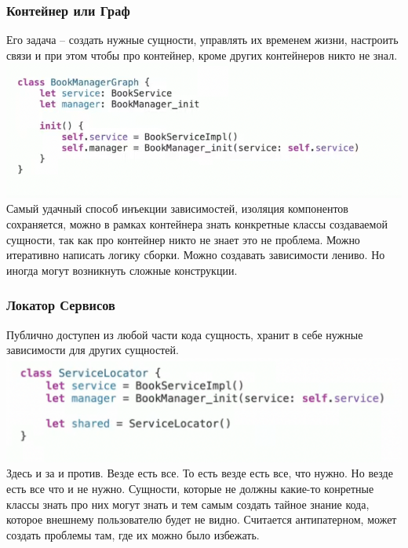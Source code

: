 \documentclass{article}
\begin{document}
    \subsubsection{Контейнер или Граф}
    Его задача -- создать нужные сущности, управлять их временем жизни, настроить связи и при этом чтобы про контейнер, кроме других контейнеров никто не знал. 
    \newline
    \includegraphics[scale = 0.5]{pic/Снимок экрана 2023-07-31 в 01.30.14.png}
    \newline
    Самый удачный способ инъекции зависимостей, изоляция компонентов сохраняется, можно в рамках контейнера знать конкретные классы создаваемой сущности, так как про контейнер никто не знает это не проблема. Можно итеративно написать логику сборки. Можно создавать зависимости лениво. 
    \newline
    Но иногда могут возникнуть сложные конструкции. 
    \subsubsection{Локатор Сервисов}
    Публично доступен из любой части кода сущность, хранит в себе нужные зависимости для других сущностей. 
    \newline
    \includegraphics[scale = 0.5]{pic/Снимок экрана 2023-07-31 в 01.32.46.png}
    \newline
    Здесь и за и против. Везде есть все. То есть везде есть все, что нужно. Но везде есть все что и не нужно. Сущности, которые не должны какие-то конретные классы знать про них могут знать и тем самым создать тайное знание кода, которое внешнему пользователю будет не видно. Считается антипатерном, может создать проблемы там, где их можно было избежать. 
\end{document}
